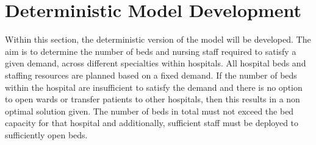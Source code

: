 \documentclass[../thesis.tex]{subfiles}
\begin{document}
{%










\section{Deterministic Model Development}\label{sec:DeterministicModel}
Within this section, the deterministic version of the model will be developed. The aim is to determine the number of beds and nursing staff required to satisfy a given demand, across different specialties within hospitals. 
All hospital beds and staffing resources are planned based on a fixed demand. If the number of beds within the hospital are insufficient to satisfy the demand and there is no option to open wards or transfer patients to other hospitals, then this results in a non optimal solution given. The number of beds in total must not exceed the bed capacity for that hospital and additionally, sufficient staff must be deployed to sufficiently open beds.

}
\end{document}

